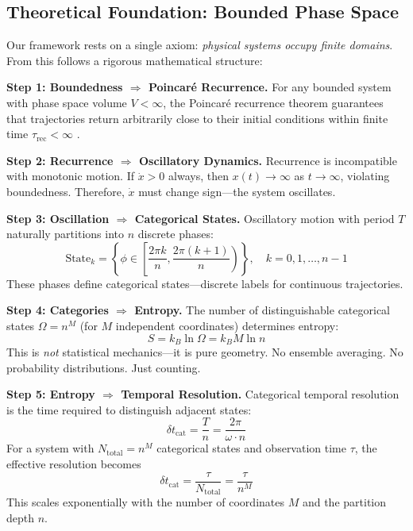 \documentclass[twocolumn,10pt]{article}
\theoremstyle{remark}
\begin{document}
\subsection{Theoretical Foundation: Bounded Phase Space}

Our framework rests on a single axiom: \textit{physical systems occupy finite domains}. From this follows a rigorous mathematical structure:

\textbf{Step 1: Boundedness $\Rightarrow$ Poincaré Recurrence.} 
For any bounded system with phase space volume $V < \infty$, the Poincaré recurrence theorem guarantees that trajectories return arbitrarily close to their initial conditions within finite time $\tau_{\text{rec}} < \infty$ \cite{poincare1890}.

\textbf{Step 2: Recurrence $\Rightarrow$ Oscillatory Dynamics.}
Recurrence is incompatible with monotonic motion. If $\dot{x} > 0$ always, then $x(t) \to \infty$ as $t \to \infty$, violating boundedness. Therefore, $\dot{x}$ must change sign---the system oscillates.

\textbf{Step 3: Oscillation $\Rightarrow$ Categorical States.}
Oscillatory motion with period $T$ naturally partitions into $n$ discrete phases:
\begin{equation}
    \text{State}_k = \left\{\phi \in \left[\frac{2\pi k}{n}, \frac{2\pi(k+1)}{n}\right) \right\}, \quad k = 0, 1, \ldots, n-1
\end{equation}
These phases define categorical states---discrete labels for continuous trajectories.

\textbf{Step 4: Categories $\Rightarrow$ Entropy.}
The number of distinguishable categorical states $\Omega = n^M$ (for $M$ independent coordinates) determines entropy:
\begin{equation}
    S = k_B \ln \Omega = k_B M \ln n
\end{equation}
This is \textit{not} statistical mechanics---it is pure geometry. No ensemble averaging. No probability distributions. Just counting.

\textbf{Step 5: Entropy $\Rightarrow$ Temporal Resolution.}
Categorical temporal resolution is the time required to distinguish adjacent states:
\begin{equation}
    \delta t_{\text{cat}} = \frac{T}{n} = \frac{2\pi}{\omega \cdot n}
\end{equation}
For a system with $N_{\text{total}} = n^M$ categorical states and observation time $\tau$, the effective resolution becomes
\begin{equation}
    \delta t_{\text{cat}} = \frac{\tau}{N_{\text{total}}} = \frac{\tau}{n^M}
\end{equation}
This scales exponentially with the number of coordinates $M$ and the partition depth $n$.
\end{document}
